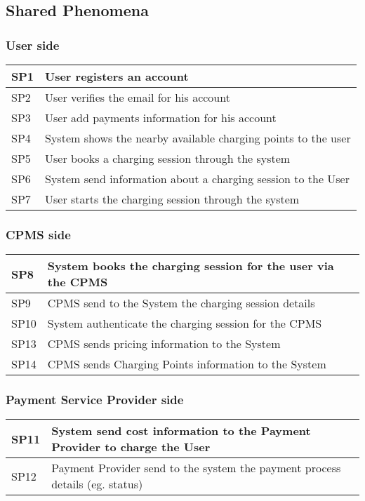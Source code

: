 \subsection{Shared Phenomena}
\subsubsection{User side}
\begin{tabular}{|l|l|}
	\hline
	SP1 & User registers an account\\
	\hline
	SP2 & User verifies the email for his account\\
	\hline
	SP3 & User add payments information for his account\\
	\hline
	SP4 & System shows the nearby available charging points to the user\\
	\hline
	SP5 & User books a charging session through the system\\
	\hline
	SP6 & System send information about a charging session to the User\\
	\hline
	SP7 & User starts the charging session through the system\\
	\hline
\end{tabular}

\subsubsection{CPMS side}
\begin{tabular}{|l|l|}
	\hline
	SP8 & System books the charging session for the user via the CPMS\\
	\hline
	SP9 & CPMS send to the System the charging session details\\
	\hline
	SP10 & System authenticate the charging session for the CPMS\\
	\hline
	SP13 & CPMS sends pricing information to the System\\
	\hline
	SP14 & CPMS sends Charging Points information to the System\\
	\hline
\end{tabular}

\subsubsection{Payment Service Provider side}
\begin{tabular}{|l|l|}
	\hline
	SP11 & System send cost information to the Payment Provider to charge the User\\
	\hline
	SP12 & Payment Provider send to the system the payment process details (eg. status)\\
	\hline
\end{tabular}\\\\

